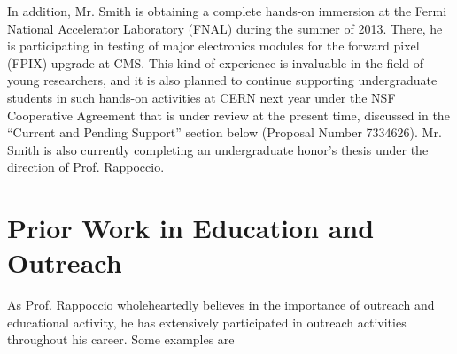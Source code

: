 \documentclass[12pt]{proposalnsf}
\begin{document}
In addition, Mr. Smith is obtaining a complete hands-on immersion at the
Fermi National Accelerator Laboratory (FNAL) during the summer of
2013. There, he is participating in testing of major electronics
modules for the forward pixel (FPIX) upgrade at CMS. This kind of
experience is invaluable in the field of young researchers, and it is also
planned to continue supporting undergraduate students in such hands-on
activities at CERN next year under the NSF Cooperative Agreement that is
under review at the present time, discussed in the ``Current and
Pending Support'' section below (Proposal Number 7334626). 
Mr. Smith is also currently completing an undergraduate honor's thesis
under the direction of Prof. Rappoccio. 

\section{Prior Work in Education and Outreach}

As Prof. Rappoccio wholeheartedly believes in the importance of outreach and
educational activity, he has extensively participated in outreach
activities throughout his career. Some examples are
\end{document}
